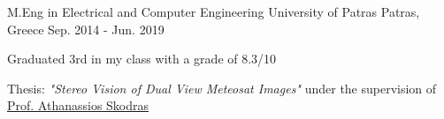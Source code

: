

\begin{cventries}

  \cventry
    {M.Eng in Electrical and Computer Engineering} %
    {University of Patras} %
    {Patras, Greece} %
    {Sep. 2014 - Jun. 2019} %
    {
      \begin{cvitems} %
        \item {Graduated 3rd in my class with a grade of 8.3/10}
        \item {Thesis: \emph{"Stereo Vision of Dual View Meteosat Images"} under the supervision of \href{http://www.ece.upatras.gr/skodras/}{Prof. Athanassios Skodras}}
      \end{cvitems}
    }

\end{cventries}
